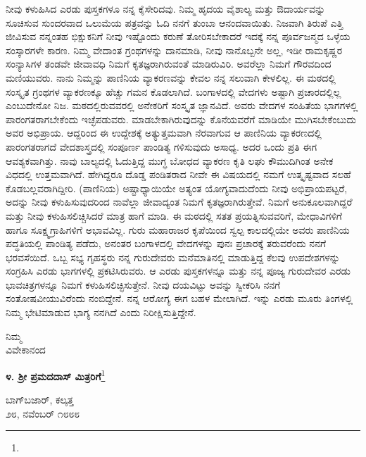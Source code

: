 ನೀವು ಕಳುಹಿಸಿದ ಎರಡು ಪುಸ್ತಕಗಳೂ ನನ್ನ ಕೈಸೇರಿದವು. ನಿಮ್ಮ ಹೃದಯ ವೈಶಾಲ್ಯ ಮತ್ತು ಔದಾರ್ಯವನ್ನು ಸೂಚಿಸುವ ಸುಂದರವಾದ ಒಲುಮೆಯ ಪತ್ರವನ್ನು ಓದಿ ನನಗೆ ತುಂಬಾ ಆನಂದವಾಯಿತು. ನಿಜವಾಗಿ ತಿರುಪೆ ಎತ್ತಿ ಜೀವಿಸುವ ನನ್ನಂತಹ ಭಿಕ್ಷುಕನಿಗೆ ನೀವು ಇಷ್ಟೊಂದು ಕರುಣೆ ತೋರಿಸಬೇಕಾದರೆ ಇದಕ್ಕೆ ನನ್ನ ಪೂರ್ವಜನ್ಮದ ಒಳ್ಳೆಯ ಸಂಸ್ಕಾರಗಳೇ ಕಾರಣ. ನಿಮ್ಮ ವೇದಾಂತ ಗ್ರಂಥಗಳನ್ನು ದಾನಮಾಡಿ, ನೀವು ನಾನೊಬ್ಬನೇ ಅಲ್ಲ, ಇಡೀ ರಾಮಕೃಷ್ಣರ ಸಂನ್ಯಾಸಿಗಳ ತಂಡವೇ ಜೀವಾವಧಿ ನಿಮಗೆ ಕೃತಜ್ಞರಾಗಿರುವಂತೆ ಮಾಡಿರುವಿರಿ. ಅವರೆಲ್ಲಾ ನಿಮಗೆ ಗೌರವದಿಂದ ಮಣಿಯುವರು. ನಾನು ನಿಮ್ಮನ್ನು ಪಾಣಿನಿಯ ವ್ಯಾಕರಣವನ್ನು ಕೇವಲ ನನ್ನ ಸಲುವಾಗಿ ಕೇಳಲಿಲ್ಲ. ಈ ಮಠದಲ್ಲಿ ಸಂಸ್ಕೃತ ಗ್ರಂಥಗಳ ವ್ಯಾಕರಣಕ್ಕೂ ಹೆಚ್ಚು ಗಮನ ಕೊಡಲಾಗಿದೆ. ಬಂಗಾಳದಲ್ಲಿ ವೇದಗಳು ಅಷ್ಟಾಗಿ ಪ್ರಚಾರದಲ್ಲಿಲ್ಲ ಎಂಬುದೇನೋ ನಿಜ. ಮಠದಲ್ಲಿರುವವರಲ್ಲಿ ಅನೇಕರಿಗೆ ಸಂಸ್ಕೃತ ಜ್ಞಾನವಿದೆ. ಅವರು ವೇದಗಳ ಸಂಹಿತೆಯ ಭಾಗಗಳಲ್ಲಿ ಪಾರಂಗತರಾಗಬೇಕೆಂದು ಇಚ್ಛೆಪಡುವರು. ಮಾಡಬೇಕಾಗಿರುವುದನ್ನು ಕೊನೆಯವರೆಗೆ ಮಾಡಿಯೇ ಮುಗಿಸಬೇಕೆಂಬುದು ಅವರ ಅಭಿಪ್ರಾಯ. ಆದ್ದರಿಂದ ಈ ಉದ್ದೇಶಕ್ಕೆ ಅತ್ಯುತ್ತಮವಾಗಿ ನೆರವಾಗುವ ಆ ಪಾಣಿನಿಯ ವ್ಯಾಕರಣದಲ್ಲಿ ಪಾರಂಗತರಾಗದೆ ವೇದಶಾಸ್ತ್ರದಲ್ಲಿ ಸಂಪೂರ್ಣ ಪಾಂಡಿತ್ಯ ಗಳಿಸುವುದು ಅಸಾಧ್ಯ. ಅದರ ಒಂದು ಪ್ರತಿ ಈಗ ಆವಶ್ಯಕವಾಗಿತ್ತು. ನಾವು ಬಾಲ್ಯದಲ್ಲಿ ಓದುತ್ತಿದ್ದ ಮುಗ್ಧ ಬೋಧದ ವ್ಯಾಕರಣ ಕೃತಿ ಲಘು ಕೌಮುದಿಗಿಂತ ಅನೇಕ ವಿಧದಲ್ಲಿ ಉತ್ತಮವಾಗಿದೆ. ಹೇಗಿದ್ದರೂ ದೊಡ್ಡ ಪಂಡಿತರಾದ ನೀವೇ ಈ ವಿಷಯದಲ್ಲಿ ನಮಗೆ ಉತ್ಕೃಷ್ಟವಾದ ಸಲಹೆ ಕೊಡಬಲ್ಲವರಾಗಿದ್ದೀರಿ. (ಪಾಣಿನಿಯ) ಅಷ್ಟಾಧ್ಯಾಯಿಯೇ ಅತ್ಯಂತ ಯೋಗ್ಯವಾದು\break ದೆಂದು ನೀವು ಅಭಿಪ್ರಾಯಪಟ್ಟರೆ, ಅದನ್ನು ನೀವು ಕಳುಹಿಸುವುದರಿಂದ ನಾವೆಲ್ಲಾ ಜೀವಾದ್ಯಂತ ನಿಮಗೆ ಕೃತಜ್ಞರಾಗಿರುತ್ತೇವೆ. ನಿಮಗೆ ಅನುಕೂಲವಾಗಿದ್ದರೆ ಮತ್ತು ನೀವು ಕಳುಹಿಸಲಿಚ್ಚಿಸಿದರೆ ಮಾತ್ರ ಹಾಗೆ ಮಾಡಿ. ಈ ಮಠದಲ್ಲಿ ಸತತ ಪ್ರಯತ್ನಿಸುವವರಿಗೆ, ಮೇಧಾವಿಗಳಿಗೆ ಹಾಗೂ ಸೂಕ್ಷ್ಮಗ್ರಾಹಿಗಳಿಗೆ ಅಭಾವವಿಲ್ಲ. ಗುರು ಮಹಾರಾಜರ ಕೃಪೆಯಿಂದ ಸ್ವಲ್ಪ ಕಾಲದಲ್ಲಿಯೇ ಅವರು ಪಾಣಿನಿಯ ಪದ್ಧತಿಯಲ್ಲಿ ಪಾಂಡಿತ್ಯ ಪಡೆದು, ಅನಂತರ ಬಂಗಾಳದಲ್ಲಿ ವೇದಗಳನ್ನು ಪುನಃ ಪ್ರಚಾರಕ್ಕೆ ತರುವರೆಂದು ನನಗೆ ಭರವಸೆಯಿದೆ. ಒಬ್ಬ ಸಭ್ಯ ಗೃಹಸ್ಥರು ನನ್ನ ಗುರುದೇವರು ಮನೆಮಾತಿನಲ್ಲಿ ಮಾಡುತ್ತಿದ್ದ ಕೆಲವು ಉಪದೇಶಗಳನ್ನು ಸಂಗ್ರಹಿಸಿ ಎರಡು ಭಾಗಗಳಲ್ಲಿ ಪ್ರಕಟಿಸಿರುವರು. ಆ ಎರಡು ಪುಸ್ತಕಗಳನ್ನೂ ಮತ್ತು ನನ್ನ ಪೂಜ್ಯ ಗುರುದೇವರ ಎರಡು ಭಾವಚಿತ್ರಗಳನ್ನೂ ನಿಮಗೆ ಕಳು\break ಹಿಸಲಿಚ್ಛಿಸುತ್ತೇನೆ. ನೀವು ದಯವಿಟ್ಟು ಅವನ್ನು ಸ್ವೀಕರಿಸಿ ನನಗೆ ಸಂತೋಷವೀಯುವಿರೆಂದು ನಂಬಿದ್ದೇನೆ. ನನ್ನ ಆರೋಗ್ಯ ಈಗ ಬಹಳ ಮೇಲಾಗಿದೆ. ಇನ್ನು ಎರಡು ಮೂರು ತಿಂಗಳಲ್ಲಿ ನಿಮ್ಮ ಭೇಟಿಮಾಡುವ ಭಾಗ್ಯ ನನಗಿದೆ ಎಂದು ನಿರೀಕ್ಷಿಸುತ್ತಿದ್ದೇನೆ.

{\flushright
ನಿಮ್ಮ\\ವಿವೇಕಾನಂದ\par}

\begin{center}
\textbf{೪. ಶ‍್ರೀ ಪ್ರಮದದಾಸ್ ಮಿತ್ರರಿಗೆ}\footnote{}
\end{center}

\begin{flushright}
ಬಾಗ್‌ಬಜಾರ್, ಕಲ್ಕತ್ತ \\೨೮, ನವೆಂಬರ್ ೧೮೮೮
\end{flushright}

